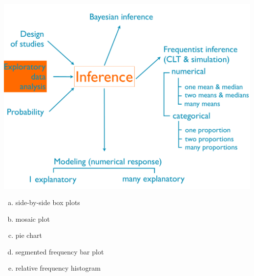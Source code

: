 \documentclass[11pt,containsverbatim,handout,xcolor=xelatex,dvipsnames,table]{beamer}
\newcommand{\solnMult}[1]{#1}
\begin{document}
\begin{frame}

{
{\scriptsize
{}}}
{
 \includegraphics[width=\textwidth]{figures/map/eda}
}

\vfill

{\footnotesize
\begin{enumerate}[(a)]
\item side-by-side box plots
\item \solnMult{mosaic plot}
\item pie chart
\item segmented frequency bar plot
\item relative frequency histogram
\end{enumerate}
}

\end{frame}

\end{document}
